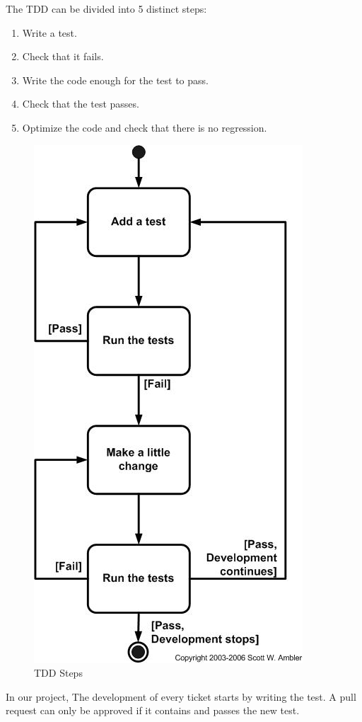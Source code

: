\begin{spacing}{1.2}
The TDD can be divided into 5 distinct steps:
\begin{enumerate}
	\item  Write a test.
	\item Check that it fails.
	\item Write the code enough for the test to pass.
	\item Check that the test passes.
	\item Optimize the code and check that there is no regression.
\end{enumerate}

\begin{figure}[!ht]\centering
\includegraphics[scale=0.6]{images/tddSteps.jpg}
\caption{TDD Steps}
\label{fig:fig1}
\end{figure}
\newpage
In our project, The development of every ticket starts by writing the test. A pull request can only be approved if it contains and passes the new test.


\end{spacing}
